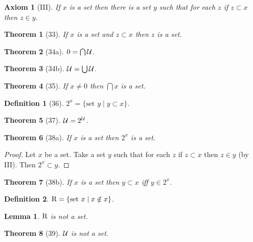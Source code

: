 \documentclass{scrartcl}
\newenvironment{forthel}{\begin{leftbar}}{\end{leftbar}}
\newtheorem*{axiom}{Axiom}
\newtheorem*{lemma}{Lemma}
\newtheorem*{theorem}{Theorem}
\newtheorem*{definition}{Definition}
\begin{document}
\begin{forthel}

\begin{axiom}[III] If $x$ is a set then there is a set $y$ such that for each
$z$ if $z \subset x$ then $z \in y$.
\end{axiom}

\begin{theorem}[33] If $x$ is a set and $z \subset x$ then $z$ is a set.
\end{theorem}

\begin{theorem}[34a] $0 = \bigcap {\cal U}$.
\end{theorem}

\begin{theorem}[34b] ${\cal U} = \bigcup {\cal U}$.
\end{theorem}

\begin{theorem}[35] If $x \neq 0$ then $\bigcap x$ is a set.
\end{theorem}


\begin{definition}[36] $2^{x} = \{\text{set } y \mid y \subset x\}$.
\end{definition}

\begin{theorem}[37] ${\cal U} = 2^{{\cal U}}$.
\end{theorem}

\begin{theorem}[38a] If $x$ is a set then $2^{x}$ is a set.
\end{theorem}
\begin{proof} Let $x$ be a set.
Take a set $y$ such that for each $z$ 
if $z \subset x$ then $z \in y$ (by III).
Then $2^{x} \subset y$.
\end{proof}

\begin{theorem}[38b] If $x$ is a set then $y \subset x$ iff $y \in 2^{x}$.
\end{theorem}

\begin{definition} ${\rm R} = \{\text{set } x \mid x \notin x\}$.
\end{definition}

\begin{lemma} ${\rm R}$ is not a set. \end{lemma}

\begin{theorem}[39] ${\cal U}$ is not a set.
\end{theorem}


\end{forthel}
\end{document}
